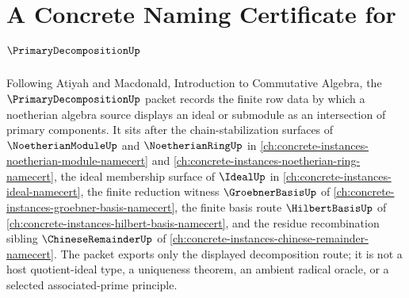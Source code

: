 \chapter{A Concrete Naming Certificate for $\PrimaryDecompositionUp$}
\label{ch:concrete-instances-primary-decomposition-namecert}

Following Atiyah and Macdonald, Introduction to Commutative Algebra, the $\PrimaryDecompositionUp$ packet records the finite row data by which a noetherian algebra source displays an ideal or submodule as an intersection of primary components. It sits after the chain-stabilization surfaces of $\NoetherianModuleUp$ and $\NoetherianRingUp$ in \autoref{ch:concrete-instances-noetherian-module-namecert} and \autoref{ch:concrete-instances-noetherian-ring-namecert}, the ideal membership surface of $\IdealUp$ in \autoref{ch:concrete-instances-ideal-namecert}, the finite reduction witness $\GroebnerBasisUp$ of \autoref{ch:concrete-instances-groebner-basis-namecert}, the finite basis route $\HilbertBasisUp$ of \autoref{ch:concrete-instances-hilbert-basis-namecert}, and the residue recombination sibling $\ChineseRemainderUp$ of \autoref{ch:concrete-instances-chinese-remainder-namecert}. The packet exports only the displayed decomposition route; it is not a host quotient-ideal type, a uniqueness theorem, an ambient radical oracle, or a selected associated-prime principle.

